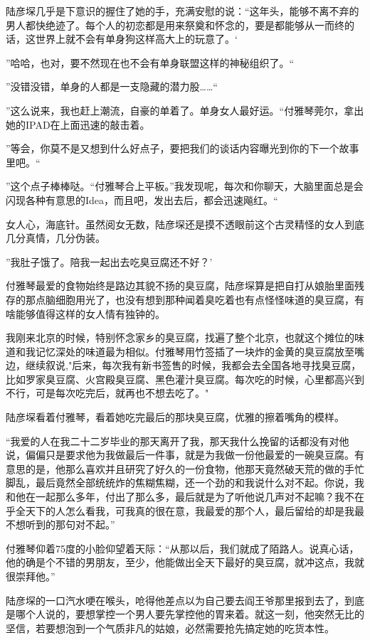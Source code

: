 \documentclass[11pt,a4paper]{article}
\begin{document}
陆彦堔几乎是下意识的握住了她的手，充满安慰的说：“这年头，能够不离不弃的男人都快绝迹了。每个人的初恋都是用来祭奠和怀念的，要是都能够从一而终的话，这世界上就不会有单身狗这样高大上的玩意了。‘﻿﻿

”哈哈，也对，要不然现在也不会有单身联盟这样的神秘组织了。“﻿﻿

”没错没错，单身的人都是一支隐藏的潜力股……“﻿﻿

”这么说来，我也赶上潮流，自豪的单着了。单身女人最好运。“付雅琴莞尔，拿出她的IPAD在上面迅速的敲击着。﻿﻿

”等会，你莫不是又想到什么好点子，要把我们的谈话内容曝光到你的下一个故事里吧。“﻿﻿

”这个点子棒棒哒。“付雅琴合上平板。”我发现呢，每次和你聊天，大脑里面总是会闪现各种有意思的Idea，而且吧，发出去后，都会迅速飚红。“﻿﻿

女人心，海底针。虽然阅女无数，陆彦堔还是摸不透眼前这个古灵精怪的女人到底几分真情，几分伪装。﻿﻿

”我肚子饿了。陪我一起出去吃臭豆腐还不好？’﻿﻿

付雅琴最爱的食物始终是路边其貌不扬的臭豆腐，陆彦堔算是把自打从娘胎里面残存的那点脑细胞用光了，也没有想到那种闻着臭吃着也有点怪怪味道的臭豆腐，有啥能够值得这样的女人情有独钟的。﻿﻿

我刚来北京的时候，特别怀念家乡的臭豆腐，找遍了整个北京，也就这个摊位的味道和我记忆深处的味道最为相似。付雅琴用竹签插了一块炸的金黄的臭豆腐放至嘴边，继续叙说,"后来，每次我有新书签售的时候，我都会去全国各地寻找臭豆腐，比如罗家臭豆腐、火宫殿臭豆腐、黑色灌汁臭豆腐。每次吃的时候，心里都高兴到不行，可是每次吃完后，就再也不想去吃了。"﻿﻿

陆彦堔看着付雅琴，看着她吃完最后的那块臭豆腐，优雅的擦着嘴角的模样。﻿﻿

“我爱的人在我二十二岁毕业的那天离开了我，那天我什么挽留的话都没有对他说，偏偏只是要求他为我做最后一件事，就是为我做一份他最爱的一碗臭豆腐。有意思的是，他那么喜欢并且研究了好久的一份食物，他那天竟然破天荒的做的手忙脚乱，最后竟然全部统统炸的焦糊焦糊，还一个劲的和我说什么对不起。你说，我和他在一起那么多年，付出了那么多，最后就是为了听他说几声对不起嘛？我不在乎全天下的人怎么看我，可我真的很在意，我最爱的那个人，最后留给的却是我最不想听到的那句对不起。”﻿﻿

付雅琴仰着75度的小脸仰望着天际：“从那以后，我们就成了陌路人。说真心话，他的确是个不错的男朋友，至少，他能做出全天下最好的臭豆腐，就冲这点，我就很崇拜他。”﻿﻿﻿

陆彦堔的一口汽水哽在喉头，呛得他差点以为自己要去阎王爷那里报到去了，到底是哪个人说的，要想掌控一个男人要先掌控他的胃来着。就这一刻，他突然无比的坚信，若要想泡到一个气质非凡的姑娘，必然需要抢先搞定她的吃货本性。﻿﻿
\end{document}
